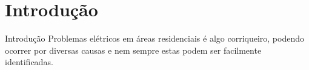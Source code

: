 \renewcommand{\titulo}{Introdução}
\section{\titulo}

\begin{frame}{\titulo}
Problemas elétricos em áreas residenciais é algo corriqueiro, podendo ocorrer por diversas causas e nem sempre estas podem ser facilmente identificadas.
\end{frame}


